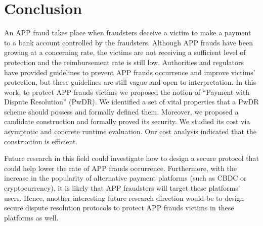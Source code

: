

\section{Conclusion}


An APP fraud takes place when fraudsters deceive a victim to make a payment to a bank account controlled by the fraudsters. Although APP frauds have been growing at a concerning rate, the  victims are not receiving a sufficient level of protection and the reimbursement rate is still low. Authorities and regulators have  provided guidelines  to prevent APP frauds occurrence and improve victims’ protection, but these guidelines are still vague and open to interpretation. In this work, to protect APP frauds victims  we proposed the notion of “Payment with Dispute Resolution” (PwDR). We identified a set of vital properties that a PwDR scheme should possess and formally defined them. Moreover,  we proposed a candidate construction and formally proved its security. We studied its cost via asymptotic and concrete runtime evaluation. Our cost analysis indicated that the construction is efficient. 


Future research in this field could investigate how to design a secure protocol that could help lower the rate of APP frauds occurrence. Furthermore, with the increase in the popularity of  alternative payment platforms (such as CBDC or cryptocurrency), it is likely that APP fraudsters will target these platforms' users. Hence, another interesting future research direction would be to design secure dispute resolution protocols  to protect  APP frauds victims in these platforms as well. 



